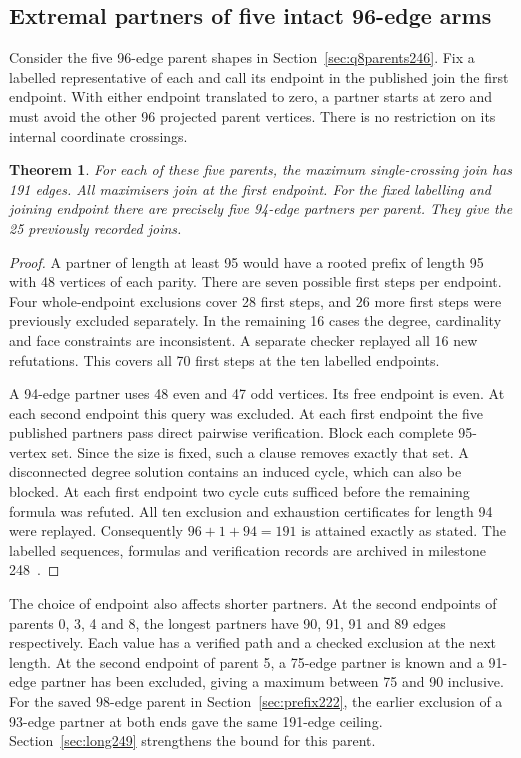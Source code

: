 \documentclass[11pt,a4paper]{article}
\newtheorem{theorem}{Theorem}[section]
\theoremstyle{definition}
\theoremstyle{remark}
\begin{document}
\subsection{Extremal partners of five intact 96-edge arms}\label{sec:root248}

Consider the five 96-edge parent shapes in
Section~\ref{sec:q8parents246}. Fix a labelled representative of each
and call its endpoint in the published join the first endpoint.
With either endpoint translated to zero, a partner starts at zero and
must avoid the other 96 projected parent vertices. There is no
restriction on its internal coordinate crossings.

\begin{theorem}
For each of these five parents, the maximum single-crossing join has
191 edges. All maximisers join at the first endpoint. For the fixed
labelling and joining endpoint there are precisely five 94-edge partners
per parent. They give the 25 previously recorded joins.
\end{theorem}

\begin{proof}
A partner of length at least 95 would have a rooted prefix of length
95 with 48 vertices of each parity. There are seven possible first
steps per endpoint. Four whole-endpoint exclusions cover 28 first steps, and
26 more first steps were previously excluded separately. In the
remaining 16 cases the degree, cardinality and face constraints are
inconsistent. A separate checker replayed all 16 new refutations.
This covers all 70 first steps at the ten labelled endpoints.

A 94-edge partner uses 48 even and 47 odd vertices. Its free endpoint
is even. At each second endpoint this query was excluded. At each first
endpoint the five published partners pass direct pairwise verification.
Block each complete 95-vertex set. Since the size is fixed, such a clause
removes exactly that set. A disconnected degree solution contains an
induced cycle, which can also be blocked. At each first endpoint two
cycle cuts sufficed before the remaining formula was refuted. All ten
exclusion and exhaustion certificates for length 94 were replayed.
Consequently \(96+1+94=191\) is attained exactly as stated.
The labelled sequences, formulas and verification records are archived in
milestone 248~\cite{root248}.
\end{proof}

The choice of endpoint also affects shorter partners. At the second
endpoints of parents 0, 3, 4 and 8, the longest partners have 90, 91,
91 and 89 edges respectively. Each value has a verified path and a
checked exclusion at the next length. At the second endpoint of
parent 5, a 75-edge partner is known and a 91-edge partner has
been excluded, giving a maximum between 75 and 90 inclusive.
For the saved 98-edge parent
in Section~\ref{sec:prefix222}, the earlier exclusion of a 93-edge
partner at both ends gave the same 191-edge ceiling. Section~\ref{sec:long249}
strengthens the bound for this parent.
\end{document}
